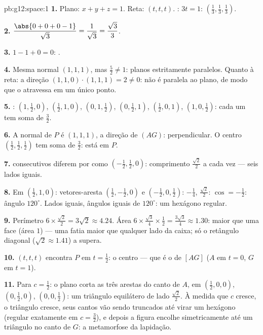 \begin{solution}{pb:g12:space:1}
\textbf{1.} Plano: $x + y + z = 1$. Reta: $(t, t, t)$.
: $3t = 1$:
$\left(\frac13, \frac13, \frac13\right)$.

\textbf{2.} $\dfrac{\abs{0 + 0 + 0 - 1}}{\sqrt3} =
\dfrac{1}{\sqrt3} = \dfrac{\sqrt3}{3}$.

\textbf{3.} $1 - 1 + 0 = 0$: .

\textbf{4.} Mesma normal $(1,1,1)$, mas $\frac52 \neq 1$:
planos estritamente paralelos. Quanto à reta: a direção
$(1,1,0) \cdot (1,1,1) = 2 \neq 0$: não é paralela ao plano, de
modo que o atravessa em um único ponto.

\textbf{5.} : $\left(1, \frac12, 0\right)$,
$\left(\frac12, 1, 0\right)$, $\left(0, 1, \frac12\right)$,
$\left(0, \frac12, 1\right)$, $\left(\frac12, 0, 1\right)$,
$\left(1, 0, \frac12\right)$: cada um tem soma de 
$\frac32$.

\textbf{6.} A normal de $P$ é $(1,1,1)$, a direção de $(AG)$:
perpendicular. O centro
$\left(\frac12,\frac12,\frac12\right)$ tem soma de 
$\frac32$: está em $P$.

\textbf{7.}  consecutivos diferem por  como
$\left(-\frac12, \frac12, 0\right)$: comprimento
$\frac{\sqrt2}{2}$ a cada vez --- seis lados iguais.

\textbf{8.} Em $\left(\frac12, 1, 0\right)$: vetores-aresta
$\left(\frac12, -\frac12, 0\right)$ e
$\left(-\frac12, 0, \frac12\right)$: 
$-\frac14$,  $\frac{\sqrt2}{2}$: $\cos = -\frac12$:
ângulo $120^\circ$. Lados iguais, ângulos iguais de
$120^\circ$: um hexágono regular.

\textbf{9.} Perímetro $6 \times \frac{\sqrt2}{2} = 3\sqrt2
\approx 4.24$. Área $6 \times \frac{\sqrt3}{4} \times
\frac12 = \frac{3\sqrt3}{4} \approx 1.30$: maior que uma face
(área $1$) --- uma fatia maior que qualquer lado da caixa; só
o retângulo diagonal ($\sqrt2 \approx 1.41$) a supera.

\textbf{10.} $(t,t,t)$ encontra $P$ em $t = \frac12$: o centro
--- que é o  de $[AG]$ ($A$ em $t = 0$, $G$ em
$t = 1$).

\textbf{11.} Para $c = \frac12$: o plano corta as três arestas
do canto de $A$, em $\left(\frac12,0,0\right)$,
$\left(0,\frac12,0\right)$, $\left(0,0,\frac12\right)$: um
triângulo equilátero de lado $\frac{\sqrt2}{2}$. À medida que
$c$ cresce, o triângulo cresce, seus cantos vão sendo
truncados até virar um hexágono (regular exatamente em
$c = \frac32$), e depois a figura encolhe simetricamente até
um triângulo no canto de $G$: a metamorfose da lapidação.


\end{solution}
